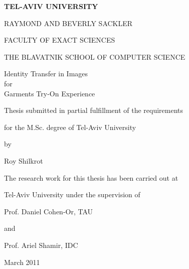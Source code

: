%
%

\begin{center}

\thispagestyle{empty}


\large\textbf{TEL-AVIV UNIVERSITY}

\large{RAYMOND AND BEVERLY SACKLER}

\large{FACULTY OF EXACT SCIENCES}

\large{THE BLAVATNIK SCHOOL OF COMPUTER SCIENCE}

\titlespace

\titlespace

\Huge{Identity Transfer in Images}\\
\linespread{1.3} \LARGE{for}\\
\linespread{1.1}\Huge{Garments Try-On Experience}\linespread{1.4}

\titlespace

\titlespace

\titlespace

\large{Thesis submitted in partial fulfillment of the
requirements}

\large{for the M.Sc. degree of Tel-Aviv University}

\large{by}

\large{Roy Shilkrot}

\titlespace

\titlespace

\large{The research work for this thesis has been carried out at}

\large{Tel-Aviv University under the supervision of}

\titlespace

\large{Prof. Daniel Cohen-Or, TAU}

\large{and}

\large{Prof. Ariel Shamir, IDC}

\titlespace

\titlespace

\titlespace

\large{March 2011}

\end{center}

\cleardoublepage
